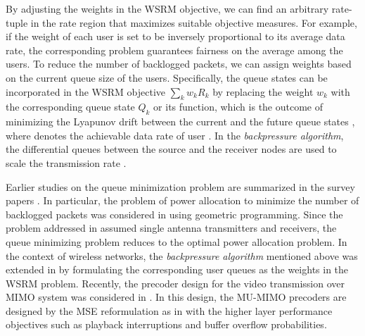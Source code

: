By adjusting the weights in the \ac{WSRM} objective, we can find an arbitrary rate-tuple in the rate region that maximizes suitable objective measures. For example, if the weight of each user is set to be inversely proportional to its average data rate, the corresponding problem guarantees fairness on the average among the users. To reduce the number of backlogged packets, we can assign weights based on the current queue size of the users. Specifically, the queue states can be incorporated in the \ac{WSRM} objective $\sum_k w_k R_k$ by replacing the weight $w_k$ with the corresponding queue state $Q_k$ or its function, which is the outcome of minimizing the Lyapunov drift between the current and the future queue states \cite{neely2010stochastic}, where  denotes the achievable data rate of user . In the \textit{backpressure algorithm}, the differential queues between the source and the receiver nodes are used to scale the transmission rate \cite{neely2010stochastic}.

Earlier studies on the queue minimization problem are summarized in the survey papers \cite{berry2004cross,layering_as_opt}. In particular, the problem of power allocation to minimize the number of backlogged packets was considered in \cite{qps_cioffi} using geometric programming. Since the problem addressed in \cite{qps_cioffi} assumed single antenna transmitters and receivers, the queue minimizing problem reduces to the optimal power allocation problem. In the context of wireless networks, the \textit{backpressure algorithm} mentioned above was extended in \cite{weeraddana2011resource} by formulating the corresponding user queues as the weights in the \ac{WSRM} problem. Recently, the precoder design for the video transmission over \ac{MIMO} system was considered in \cite{video_queues}. In this design, the \ac{MU}-\ac{MIMO} precoders are designed by the \ac{MSE} reformulation as in \cite{christensen2008weighted} with the higher layer performance objectives such as playback interruptions and buffer overflow probabilities.

